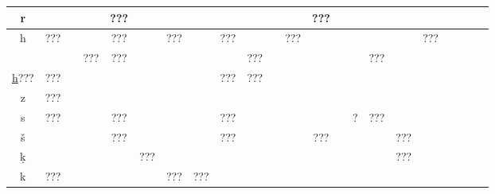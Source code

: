 \documentclass{standalone}
\newcommand{\aeg}[2][\normalsize]{{#1\pmglyph{#2}}}
\begin{document}
\begin{tabular}{|c||ccccccccccccccccccccc}
		r\sp\aeg{\Hr}             &                  &             &     & ???               &                &           &             &                              &           &       &             & ???            &       &   &     &     &               \\\hline
		h\sp\aeg{\HH}             & ???              &             &     & ???               &                & ???       & \aeg{\HJ}   & ???                          & \aeg{\Hq} &       & ???         &                &       &   &     &     & ???           \\\hline
		\uunder{h}\sp\aeg{\HC}    & \aeg{\Hthousand} &             & ??? & ???               &                &           &             &                              & ???       &       &             &                &       &   & ??? &     &               \\\hline
		\underline{h}\sp???       & ???              &             &     &                   &                &           &             & ???                          & ???       &       &             &                &       &   &     &     &               \\\hline
		z\sp\aeg{\HS}             & ???              &             &     &                   &                &           &             &                              &           &       &             &                &       &   &     &     &               \\\hline
		s\sp\aeg{\Hs}             & ???              &             &     & ???               &                &           &             & ???                          &           &       &             &                &       & ? & ??? &     &               \\\hline
		\v{s}\sp\aeg{\Hz}         & \aeg{\HE}        &             &     & ???               &                &           &             & ???                          &           &       &             & ???            &       &   &     & ??? &               \\\hline
		\d{k}\sp\aeg{\HK}         &                  &             &     &                   & ???            &           &             &                              &           &       &             &                &       &   &     & ??? &               \\\hline
		k\sp\aeg{\Hk}             & ???              &             &     &                   &                & ???       & ???         &                              &           &       &             &                &       &   &     &     &               \\\hline

\end{tabular}
\end{document}
